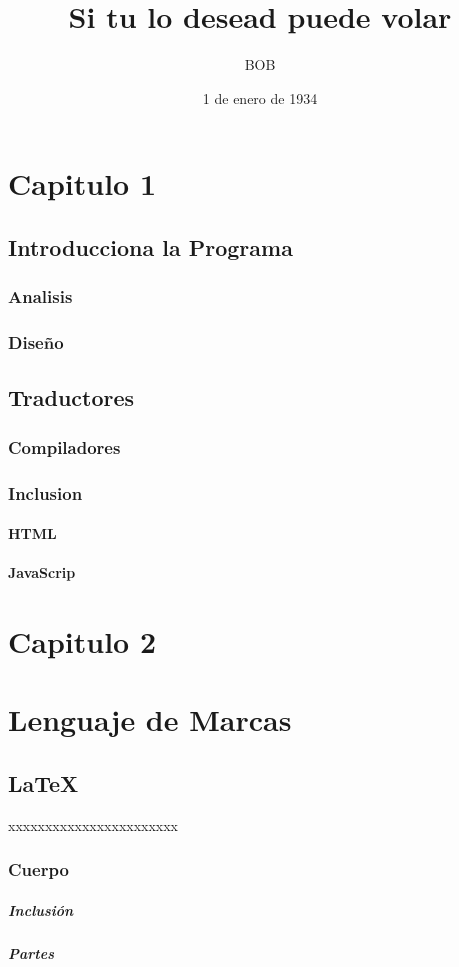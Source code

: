 \documentclass[10pt,a4paper,landscape]{report}
\title{Si tu lo desead puede volar}
\author{BOB}
\date{1 de enero de 1934}
\begin{document}
\maketitle
\chapter{Capitulo 1}
\section{Introducciona la Programa}
\subsection{Analisis}
\subsection{Diseño}
\section{Traductores}
\subsection{Compiladores}
\subsection{Inclusion}
\subsubsection{HTML}
\subsubsection{JavaScrip}
\chapter{Capitulo 2}
\chapter{Lenguaje de Marcas}
\section{LaTeX}
xxxxxxxxxxxxxxxxxxxxxxx
\subsection{Cuerpo}
\paragraph{Inclusión}
\paragraph{Partes}
\end{document}
